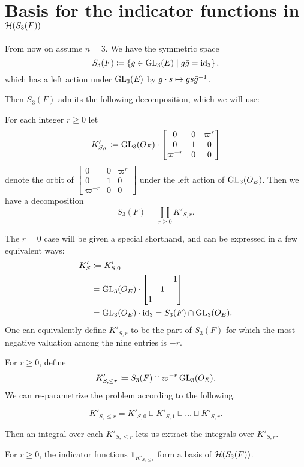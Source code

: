 \section{Basis for the indicator functions in $\mathcal H(S_3(F))$}
\label{ch:orbital0_hecke_basis}
From now on assume $n = 3$.
We have the symmetric space
\[ S_3(F) \coloneqq \left\{ g \in \operatorname{GL}_3(E) \mid g \bar{g} = \operatorname{id}_3 \right\}. \]
which has a left action under $\operatorname{GL}_3(E)$ by $g \cdot s \mapsto gs\bar{g}^{-1}$.

Then $S_3(F)$ admits the following decomposition, which we will use:
\begin{lemma}
  For each integer $r \ge 0$ let
  \[ K'_{S,r} \coloneqq \operatorname{GL}_3(O_E) \cdot \begin{bmatrix} 0 & 0 & \varpi^r \\ 0 & 1 & 0 \\ \varpi^{-r} & 0 & 0 \end{bmatrix} \]
  denote the orbit of
  $\begin{bmatrix} 0 & 0 & \varpi^r \\ 0 & 1 & 0 \\ \varpi^{-r} & 0 & 0 \end{bmatrix}$
  under the left action of $\operatorname{GL}_3(O_E)$.
  Then we have a decomposition
  \[ S_3(F) = \coprod_{r \geq 0} K'_{S,r}. \]
\end{lemma}
The $r=0$ case will be given a special shorthand,
and can be expressed in a few equivalent ways:
\begin{align*}
  K'_S
  &\coloneqq K'_{S,0} \\
  &= \operatorname{GL}_3(O_E) \cdot \begin{bmatrix} & & 1 \\ & 1 \\ 1 \end{bmatrix} \\
  &= \operatorname{GL}_3(O_E) \cdot \operatorname{id}_3 = S_3(F) \cap \operatorname{GL}_3(O_E).
\end{align*}
One can equivalently define $K'_{S,r}$ to be the part of $S_3(F)$
for which the most negative valuation among the nine entries is $-r$.

For $r \geq 0$, define
\[ K'_{S, \le r} \coloneqq S_3(F) \cap \varpi^{-r} \operatorname{GL}_3(O_E). \]
We can re-parametrize the problem according to the following.
\begin{proposition}
  \[ K'_{S, \le r} = K'_{S,0} \sqcup K'_{S,1} \sqcup \dots \sqcup K'_{S,r}. \]
\end{proposition}
Then an integral over each $K'_{S, \le r}$ lets us extract the integrals over $K'_{S,r}$.
\begin{proposition}
  For $r \ge 0$, the indicator functions $\mathbf{1}_{K'_{S, \le r}}$
  form a basis of $\mathcal H(S_3(F))$.
\end{proposition}

